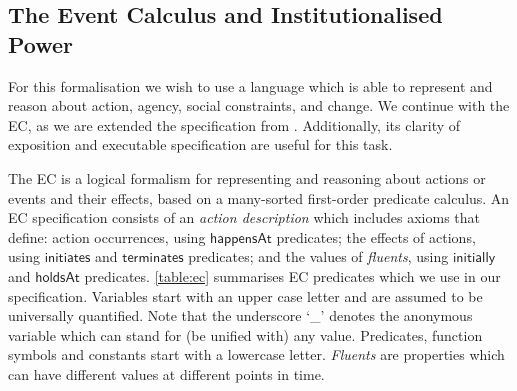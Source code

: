 
\subsection{The Event Calculus and Institutionalised Power}\label{sec:ecprimer}

For this formalisation we wish to use a language which is able to represent and reason about action, agency, social constraints, and change. 
We continue with the \ac{EC}, as we are extended the specification from . Additionally, its clarity of exposition and executable specification are useful for this task.

The \ac{EC} is a logical formalism for representing and reasoning about actions or events and their effects, based on a many-sorted first-order predicate calculus. 
An \ac{EC} specification consists of an \emph{action description} which includes axioms that define: action occurrences, using $\mathsf{happensAt}$ predicates; the effects of actions, using $\mathsf{initiates}$ and $\mathsf{terminates}$ predicates; and the values of \emph{fluents}, using $\mathsf{initially}$ and $\mathsf{holdsAt}$ predicates. 
\autoref{table:ec} summarises \ac{EC} predicates which we use in our specification. 
Variables start with an upper case letter and are assumed to be universally quantified. Note that the underscore `\_' denotes
the anonymous variable which can stand for (be unified with) any value. 
Predicates, function symbols and constants start with a lowercase letter. 
\emph{Fluents} are properties which can have different values at different points in time.

